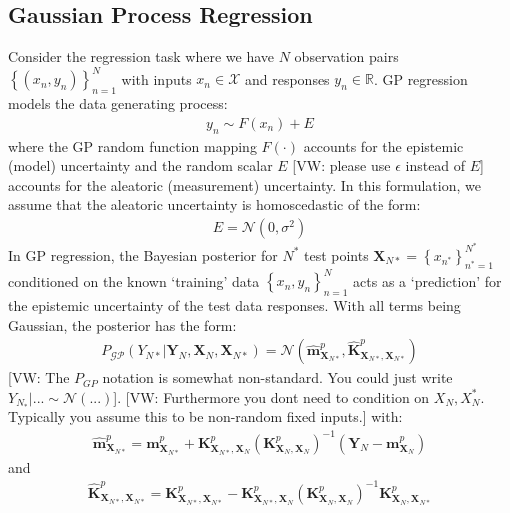 \documentclass{article}
\newcommand{\vw}[1]{{\color{green} [VW: #1]}}
\newcommand{\GP}{\operatorname{\mathcal{GP}}}
\numberwithin{equation}{section}
\begin{document}
\subsection{Gaussian Process Regression}
Consider the regression task where we have $N$ observation pairs $\left\{(x_n, y_n)\right\}_{n=1}^{N}$ with inputs $x_n \in \mathcal{X}$ and responses $y_n \in \mathbb{R}$. GP regression models the data generating process:
\begin{align}
    y_n \sim F(x_n) + E
    \label{regression-data-uncertainties}
\end{align}
where the GP random function mapping $F(\cdot)$ accounts for the epistemic (model) uncertainty and the random scalar $E$ \vw{please use $\epsilon$ instead of $E$} accounts for the aleatoric (measurement) uncertainty. In this formulation, we assume that the aleatoric uncertainty is homoscedastic of the form:
\begin{align}
    E = \mathcal{N} \left(0, \sigma^2\right)
    \label{aleotric-uncertainty}
\end{align}
In GP regression, the Bayesian posterior for $N^*$ test points $\textbf{X}_{N*} = \left\{x_{n^*}\right\}_{n^*=1}^{N^*}$ conditioned on the known `training' data $\left\{x_n, y_n \right\}_{n=1}^N$  acts as a `prediction' for the epistemic uncertainty of the test data responses. With all terms being Gaussian, the posterior has the form:
\begin{align}
    P_{\GP}\left(Y_{N*} | \mathbf{Y}_{N},  \mathbf{X}_{N},  \mathbf{X}_{N*}\right)  =  \mathcal{N}\left(\hat{\mathbf{m}}^p_{\mathbf{X}_{N*}}, \hat{\mathbf{K}}^p_{\mathbf{X}_{N*}, \mathbf{X}_{N*}}\right)
    \label{gp-epistemic-posterior}
\end{align}
\vw{The $P_{GP}$ notation is somewhat non-standard. You could just write $Y_{N_*} | ... \sim \mathcal{N}(...)$}. \vw{Furthermore you dont need to condition on $X_N, X_N^*$. Typically you assume this to be non-random fixed inputs.}
with:
\begin{align}
    \label{gp-epistemic-posterior-mean}
    \hat{\mathbf{m}}^p_{\mathbf{X}_{N*}} = \mathbf{m}^p_{\mathbf{X}_{N*}} + \mathbf{K}^p_{\mathbf{X}_{N*}, \mathbf{X}_N} \left(\mathbf{K}^p_{\mathbf{X}_N, \mathbf{X}_N}\right)^{-1} \left( \mathbf{Y}_N - \mathbf{m}^p_{\mathbf{X}_N}\right)
\end{align}
and
\begin{align}
    \label{gp-epistemic-posterior-covariance}
    \hat{\mathbf{K}}^p_{\mathbf{X}_{N*}, \mathbf{X}_{N*}} = \mathbf{K}^p_{\mathbf{X}_{N*}, \mathbf{X}_{N*}} - \mathbf{K}^p_{\mathbf{X}_{N*}, \mathbf{X}_N}\left(\mathbf{K}^p_{\mathbf{X}_N, \mathbf{X}_N}\right)^{-1}\mathbf{K}^p_{\mathbf{X}_N, \mathbf{X}_{N*}}
\end{align}
\end{document}
